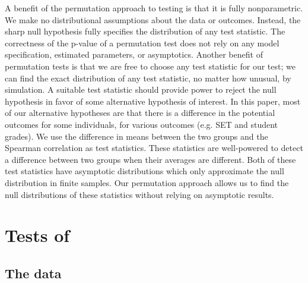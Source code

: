 \documentclass[12pt]{article}
\begin{document}
A benefit of the permutation approach to testing is that it is fully nonparametric.  We make no distributional assumptions about the data or outcomes.  Instead, the sharp null hypothesis fully specifies the distribution of any test statistic.  The correctness of the p-value of a permutation test does not rely on any model specification, estimated parameters, or asymptotics.  Another benefit of permutation tests is that we are free to choose any test statistic for our test; we can find the exact distribution of any test statistic, no matter how unusual, by simulation.  A suitable test statistic should provide power to reject the null hypothesis in favor of some alternative hypothesis of interest.   In this paper, most of our alternative hypotheses are that there is a difference in the potential outcomes for some individuals, for various outcomes (e.g. SET and student grades).  We use the difference in means between the two groups and the Spearman correlation as test statistics.  These statistics are well-powered to detect a difference between two groups when their averages are different.  Both of these test statistics have asymptotic distributions which only approximate the null distribution in finite samples. Our permutation approach allows us to find the null distributions of these statistics without relying on asymptotic results.


\section{Tests of \citet{Boring2015}}
\subsection{The data}
\end{document}

